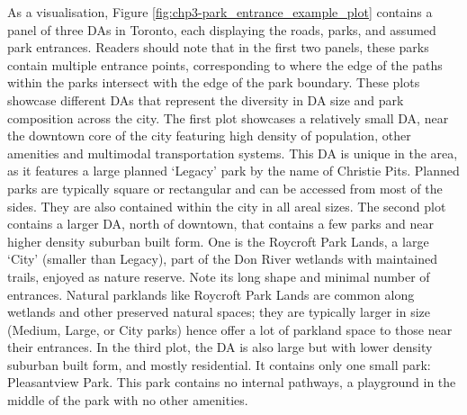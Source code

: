 \documentclass[
11pt, %
oneside, %
english, %
singlespacing, %
]{macthesis} %
\begin{document}
As a visualisation, Figure \ref{fig:chp3-park_entrance_example_plot} contains a panel of three DAs in Toronto, each displaying the roads, parks, and assumed park entrances. Readers should note that in the first two panels, these parks contain multiple entrance points, corresponding to where the edge of the paths within the parks intersect with the edge of the park boundary. These plots showcase different DAs that represent the diversity in DA size and park composition across the city. The first plot showcases a relatively small DA, near the downtown core of the city featuring high density of population, other amenities and multimodal transportation systems. This DA is unique in the area, as it features a large planned `Legacy' park by the name of Christie Pits. Planned parks are typically square or rectangular and can be accessed from most of the sides. They are also contained within the city in all areal sizes. The second plot contains a larger DA, north of downtown, that contains a few parks and near higher density suburban built form. One is the Roycroft Park Lands, a large `City' (smaller than Legacy), part of the Don River wetlands with maintained trails, enjoyed as nature reserve. Note its long shape and minimal number of entrances. Natural parklands like Roycroft Park Lands are common along wetlands and other preserved natural spaces; they are typically larger in size (Medium, Large, or City parks) hence offer a lot of parkland space to those near their entrances. In the third plot, the DA is also large but with lower density suburban built form, and mostly residential. It contains only one small park: Pleasantview Park. This park contains no internal pathways, a playground in the middle of the park with no other amenities.
\end{document}
